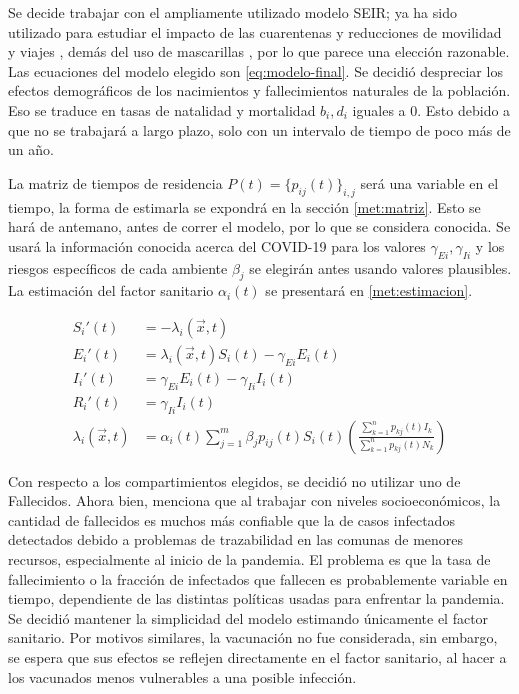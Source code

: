 Se decide trabajar con el ampliamente utilizado modelo SEIR; ya ha sido utilizado para estudiar el impacto de las cuarentenas y reducciones de movilidad y viajes \cite{Lai2020}\cite{Chinazzi2020}, demás del uso de mascarillas \cite{Kai2020}, por lo que parece una elección razonable. Las ecuaciones del modelo elegido son \ref{eq:modelo-final}. Se decidió despreciar los efectos demográficos de los nacimientos y fallecimientos naturales de la población. Eso se traduce en tasas de natalidad y mortalidad \(b_i, d_i\) iguales a 0. Esto debido a que no se trabajará a largo plazo, solo con un intervalo de tiempo de poco más de un año.

La matriz de tiempos de residencia \(P(t) = \{p_{ij}(t)\}_{i,j}\) será una variable en el tiempo, la forma de estimarla se expondrá en la sección \ref{met:matriz}. Esto se hará de antemano, antes de correr el modelo, por lo que se considera conocida. Se usará la información conocida acerca del COVID-19 para los valores \(\gamma_{Ei}, \gamma_{Ii}\) y los riesgos específicos de cada ambiente \(\beta_j\) se elegirán antes usando valores plausibles. La estimación del factor sanitario \(\alpha_i(t)\) se presentará en \ref{met:estimacion}.

\begin{equation}\label{eq:modelo-final}
\begin{aligned}
S_i'(t) &= - \lambda_i(\vec{x}, t)\\
E_i'(t) &= \lambda_i(\vec{x}, t) S_i(t)  - \gamma_{Ei} E_i(t) \\ 
I_i'(t) &= \gamma_{Ei} E_i(t)  - \gamma_{Ii} I_i(t) \\ 
R_i'(t) &= \gamma_{Ii} I_i(t) \\
\lambda_i(\vec{x}, t) &= \alpha_i(t)\sum_{j=1}^m \beta_{j}p_{ij}(t) S_i(t) \left(\frac{\sum_{k=1}^{n}p_{kj}(t) I_k}{\sum_{k=1}^{n}p_{kj}(t)N_k}\right)
\end{aligned}
\end{equation}

Con respecto a los compartimientos elegidos, se decidió no utilizar uno de Fallecidos. Ahora bien, \cite{Mena2021} menciona que al trabajar con niveles socioeconómicos, la cantidad de fallecidos es muchos más confiable que la de casos infectados detectados debido a problemas de trazabilidad en las comunas de menores recursos, especialmente al inicio de la pandemia. El problema es que la tasa de fallecimiento o la fracción de infectados que fallecen es probablemente variable en tiempo, dependiente de las distintas políticas usadas para enfrentar la pandemia. Se decidió mantener la simplicidad del modelo estimando únicamente el factor sanitario. Por motivos similares, la vacunación no fue considerada, sin embargo, se espera que sus efectos se reflejen directamente en el factor sanitario, al hacer a los vacunados menos vulnerables a una posible infección.


